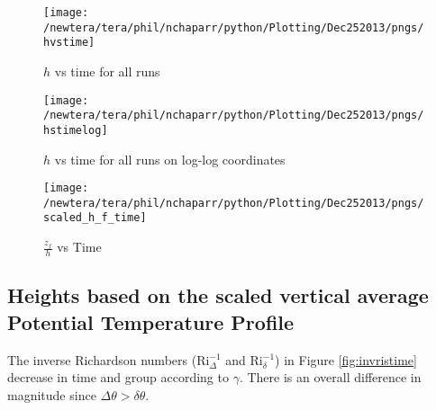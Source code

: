 \begin{figure}[htbp]
    \centering
    \texttt{[image: /newtera/tera/phil/nchaparr/python/Plotting/Dec252013/pngs/hvstime]}
    \caption{$h$ vs time for all runs}
    \label{fig:hvstime}   %
\end{figure}

\begin{figure}[htbp]
    \centering
    \texttt{[image: /newtera/tera/phil/nchaparr/python/Plotting/Dec252013/pngs/hstimelog]}
    \caption{$h$ vs time for all runs on log-log coordinates}
    \label{fig:loghvstime}   %
\end{figure}


\begin{figure}[htbp]
    \centering
    \texttt{[image: /newtera/tera/phil/nchaparr/python/Plotting/Dec252013/pngs/scaled\_h\_f\_time]}
    \caption{$\frac{z_{f}}{h}$ vs Time}
    \label{fig:zfvstime}   %
\end{figure}

\clearpage

\subsection{Heights based on the scaled vertical average Potential Temperature Profile}
\label{subsec:thetari}

The inverse Richardson numbers (\acs{Ri}$_{\Delta}^{-1}$ and \acs{Ri}$_{\delta}^{-1}$) in Figure \ref{fig:invristime} decrease in time and group according to $\gamma$. There is an overall difference in magnitude since $\Delta \theta > \delta \theta$.\\  

